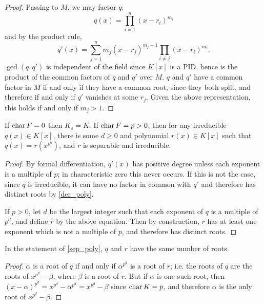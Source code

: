 \begin{proof} Passing to $M$, we may factor $q$:
\begin{equation*}
q(x) = \prod_{i = 1}^n (x - r_i)^{m_i}
\end{equation*}
and by the product rule,
\begin{equation*}
q'(x) = \sum_{j = 1}^n m_j (x - r_j)^{m_j - 1} \prod_{i \neq j} (x -
	r_i)^{m_i}.
\end{equation*}
$\gcd(q, q')$ is independent of the field since $K[x]$ is a PID, hence is the
product of the common factors of $q$ and $q'$ over $M$.  $q$ and $q'$ have a
common factor in $M$ if and only if they have a common root, since they both
split, and therefore if and only if $q'$ vanishes at some $r_j$.  Given the
above representation, this holds if and only if $m_j > 1$. \end{proof}

\begin{lemma} If $\operatorname{\text{char}}{F} = 0$ then $K_s = K$.  If $\operatorname{\text{char}}{F} = p > 0$, then for
any irreducible $q(x) \in K[x]$, there is some $d \geq 0$ and polynomial $r(x)
\in K[x]$ such that $q(x) = r(x^{p^d})$, and $r$ is separable and irreducible.
\label{sep_poly}
\end{lemma}

\begin{proof} By formal differentiation, $q'(x)$ has positive degree unless
each exponent is a multiple of $p$; in characteristic zero this never occurs.
If this is not the case, since $q$ is irreducible, it can have no factor in
common with $q'$ and therefore has distinct roots by \ref{der_poly}.

If $p > 0$, let $d$ be the largest integer such that each exponent of $q$ is a
multiple of $p^d$, and define $r$ by the above equation.  Then by
construction, $r$ has at least one exponent which is not a multiple of $p$,
and therefore has distinct roots. \end{proof}

\begin{corollary} In the statement of \ref{sep_poly}, $q$ and $r$ have the same
number of roots.
\label{sep_roots}
\end{corollary}

\begin{proof} $\alpha$ is a root of $q$ if and only if $\alpha^{p^d}$ is a
root of $r$; i.e. the roots of $q$ are the roots of $x^{p^d} - \beta$, where
$\beta$ is a root of $r$.  But if $\alpha$ is one such root, then $(x -
\alpha)^{p^d} = x^{p^d} - \alpha^{p^d} = x^{p^d} - \beta$ since $\operatorname{\text{char}}{K} =
p$, and therefore $\alpha$ is the only root of $x^{p^d} - \beta$. \end{proof}

